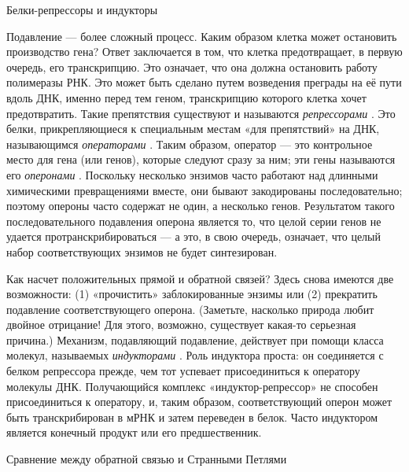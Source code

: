 \documentclass[../main.tex]{subfiles}
\begin{document}
Белки-репрессоры и индукторы

Подавление --- более сложный процесс. Каким образом клетка может остановить производство гена? Ответ заключается в том, что клетка предотвращает, в первую очередь, его транскрипцию. Это означает, что она должна остановить работу полимеразы РНК\@. Это может быть сделано путем возведения преграды на её пути вдоль ДНК, именно перед тем геном, транскрипцию которого клетка хочет предотвратить. Такие препятствия существуют и называются \emph{репрессорами} . Это белки, прикрепляющиеся к специальным местам «для препятствий» на ДНК, называющимся \emph{операторами} . Таким образом, оператор --- это контрольное место для гена (или генов), которые следуют сразу за ним; эти гены называются его \emph{оперонами} . Поскольку несколько энзимов часто работают над длинными химическими превращениями вместе, они бывают закодированы последовательно; поэтому опероны часто содержат не один, а несколько генов. Результатом такого последовательного подавления оперона является то, что целой серии генов не удается протранскрибироваться --- а это, в свою очередь, означает, что целый набор соответствующих энзимов не будет синтезирован.

Как насчет положительных прямой и обратной связей? Здесь снова имеются две возможности: (1) «прочистить» заблокированные энзимы или (2) прекратить подавление соответствующего оперона. (Заметьте, насколько природа любит двойное отрицание! Для этого, возможно, существует какая-то серьезная причина.) Механизм, подавляющий подавление, действует при помощи класса молекул, называемых \emph{индукторами} . Роль индуктора проста: он соединяется с белком репрессора прежде, чем тот успевает присоединиться к оператору молекулы ДНК\@. Получающийся комплекс «индуктор-репрессор» не способен присоединиться к оператору, и, таким образом, соответствующий оперон может быть транскрибирован в мРНК и затем переведен в белок. Часто индуктором является конечный продукт или его предшественник.

Сравнение между обратной связью и Странными Петлями
\end{document}
